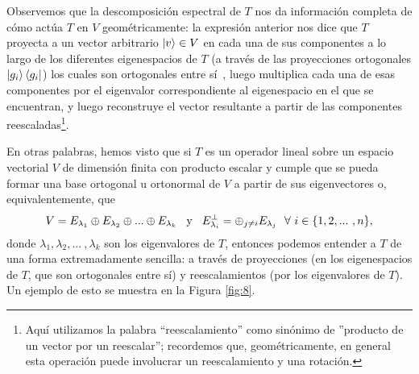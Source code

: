 \documentclass[12pt,dvipsnames]{article}
\begin{document}
\vspace{3mm}
Observemos que la descomposición espectral de $T$ nos da información completa de cómo actúa $T$ en $V$ geométricamente: la expresión anterior nos dice que $T$ proyecta a un vector arbitrario $\ket{v}\in V$ en cada una de sus componentes a lo largo de los diferentes eigenespacios de $T$ (a través de las proyecciones ortogonales $\ket{g_i}\bra{g_i}$) \textemdash los cuales son ortogonales entre sí\textemdash \ , luego multiplica cada una de esas componentes por el eigenvalor correspondiente al eigenespacio en el que se encuentran, y luego reconstruye el vector resultante a partir de las componentes reescaladas\footnote{Aquí utilizamos la palabra ``reescalamiento'' como sinónimo de ''producto de un vector por un reescalar''; recordemos que, geométricamente, en general esta operación puede involucrar un reescalamiento y una rotación.}.

\vspace{3mm}
En otras palabras, hemos visto que si $T$ es un operador lineal sobre un espacio vectorial $V$ de dimensión finita con producto escalar y cumple que se pueda formar una base ortogonal u ortonormal de $V$ a partir de sus eigenvectores o, equivalentemente, que $$V=E_{\lambda_1}\oplus E_{\lambda_2}\oplus...\oplus E_{\lambda_k}\hspace{3mm}\text{y}\hspace{3mm}E_{\lambda_i}^\perp=\oplus_{j\neq i}E_{\lambda_j} \ \ \forall \ i\in \{1,2,... \ ,n\},$$ donde $\lambda_1, \lambda_2, ... \ , \lambda_k$ son los eigenvalores de $T$, entonces podemos entender a $T$ de una forma extremadamente sencilla: a través de proyecciones (en los eigenespacios de $T$, que son ortogonales entre sí) y reescalamientos (por los eigenvalores de $T$). Un ejemplo de esto se muestra en la Figura \ref{fig:8}.
\end{document}
